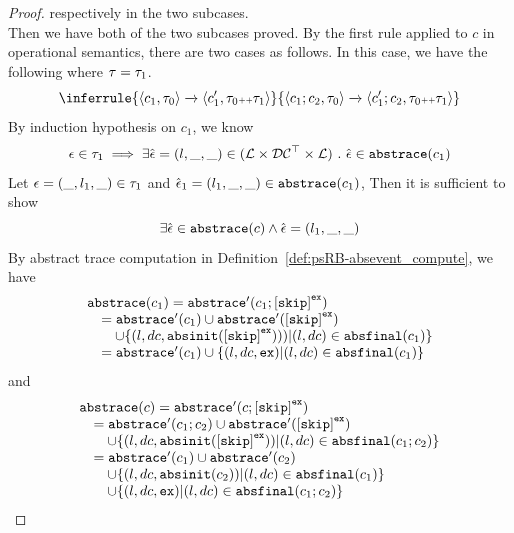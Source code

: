 \begin{proof}
    respectively in the two subcases.
    \\
    Then we have both of the two subcases proved.
    By the first rule applied to $c$ in operational semantics, there are two cases as follows.
    In this case, we have the following where $\mathtt{\tau} = \mathtt{\tau}_1$.
    \[
      \inferrule
      {
      \config{{c_1, \trace_0}}
      \xrightarrow{}
      \config{{c_1',  \trace_0 \tracecat \trace_1}}
      }
      {
      \config{{c_1; c_2, \trace_0}} 
      \xrightarrow{} 
      \config{{c_1'; c_2, \trace_0 \tracecat \trace_1}}
      }
    \]
    By induction hypothesis on $c_1$, we know 
    \[
      \mathtt{\epsilon} \in \mathtt{\tau}_1
      \implies
      \exists \hat{\mathtt{\epsilon}{}} = (l, \_, \_) \in (\mathcal{L} \times \mathcal{DC}^{\top} \times \mathcal{L}) ~.~ 
      \hat{\mathtt{\epsilon}{}} \in \mathtt{abs}{\mathtt{trace}}(c_1)
    \]
    Let $\mathtt{\epsilon} = (\_, l_1, \_) \in \mathtt{\tau}_1$ and $\hat{\mathtt{\epsilon}{}}_1 = (l_1, \_, \_) \in \mathtt{abs}{\mathtt{trace}}(c_1)$,
    Then it is sufficient to show
    \[
      \exists 
      \hat{\mathtt{\epsilon}{}} \in \mathtt{abs}{\mathtt{trace}}(c) \land \hat{\mathtt{\epsilon}{}} = (l_1, \_, \_)
    \]
    By abstract trace computation in Definition~\ref{def:psRB-absevent_compute}, we have
    \[
      \begin{array}{l}
        \absflow(c_1) = \absflow'(c_1; \clabel{\eskip}^{\lex}) 
        \\ \quad
        = \absflow'(c_1) \cup \absflow'(\clabel{\eskip}^{\lex}) 
        \\ \qquad
        \cup \{ (l, dc, \absinit(\clabel{\eskip}^{\lex}))) | (l, dc) \in \absfinal(c_1) \} 
        \\ \quad
        = \absflow'(c_1) \cup  \{ (l, dc, \lex) | (l, dc) \in \absfinal(c_1) \} 
     \end{array}
    \]  
    and 
    \[
      \begin{array}{l}
        \absflow(c) = \absflow'(c; \clabel{\eskip}^{\lex}) 
        \\ \quad
        = \absflow'(c_1;c_2) \cup \absflow'(\clabel{\eskip}^{\lex}) 
        \\ \qquad
        \cup \{ (l, dc, \absinit(\clabel{\eskip}^{\lex})) | (l, dc) \in \absfinal(c_1; c_2) \} 
        \\ \quad  
        = \absflow'(c_1) \cup \absflow'(c_2) 
        \\ \quad \quad
        \cup \{ (l, dc, \absinit(c_2)) | (l, dc) \in \absfinal(c_1) \} 
        \\ \quad \quad
        \cup \{ (l, dc, \lex) | (l, dc) \in \absfinal(c_1; c_2) \} 
     \end{array}
\]
\end{proof}
